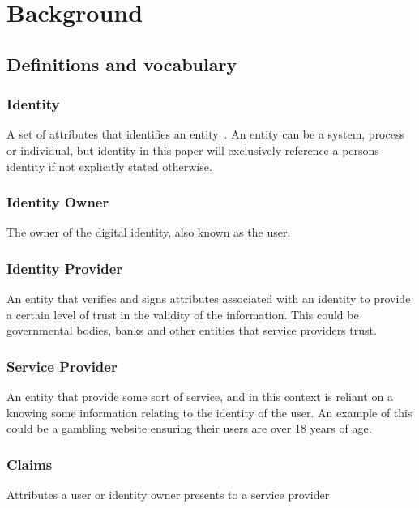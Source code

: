 \chapter{Background}
\label{chap:background}

\section{Definitions and vocabulary}
\label{sec:background_definitions}

\subsection*{Identity}
A set of attributes that identifies an entity~\cite{Weik2001}. An entity can be a system, process or individual, but identity in this paper will exclusively reference a persons identity if not explicitly stated otherwise. 
\subsection*{Identity Owner}
The owner of the digital identity, also known as the user.

\subsection*{Identity Provider}
An entity that verifies and signs attributes associated with an identity to provide a certain level of trust in the validity of the information. This could be governmental bodies, banks and other entities that service providers trust.

\subsection*{Service Provider}
An entity that provide some sort of service, and in this context is reliant on a knowing some information relating to the identity of the user. An example of this could be a gambling website ensuring their users are over 18 years of age.

\subsection*{Claims}
Attributes a user or identity owner presents to a service provider 

